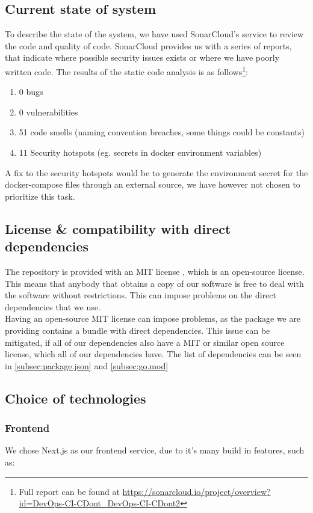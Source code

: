 \subsection{Current state of system}
To describe the state of the system, we have used SonarCloud's \cite{sonarcloud} service to review the code and quality of code. SonarCloud provides us with a series of reports, that indicate where possible security issues exists or where we have poorly written code. The results of the static code analysis is as follows\footnote{Full report can be found at \url{https://sonarcloud.io/project/overview?id=DevOps-CI-CDont_DevOps-CI-CDont2}}:
\begin{enumerate}
    \item 0 bugs
    \item 0 vulnerabilities
    \item 51 code smells (naming convention breaches, some things could be constants)
    \item 11 Security hotspots (eg. secrets in docker environment variables)
\end{enumerate}
A fix to the security hotspots would be to generate the environment secret for the docker-compose files through an external source, we have however not chosen to prioritize this task.

\subsection{License \& compatibility with direct dependencies}
The repository is provided with an MIT license \cite{mit_license}, which is an open-source license. This means that anybody that obtains a copy of our software is free to deal with the software without restrictions. This can impose problems on the direct dependencies that we use.
\\
Having an open-source MIT license can impose problems, as the package we are providing contains a bundle with direct dependencies. This issue can be mitigated, if all of our dependencies also have a MIT or similar open source license, which all of our dependencies have. The list of dependencies can be seen in \ref{subsec:package.json} and \ref{subsec:go.mod}



\subsection{Choice of technologies}
\subsubsection{Frontend}
We chose Next.js as our frontend service, due to it's many build in features, such as:

